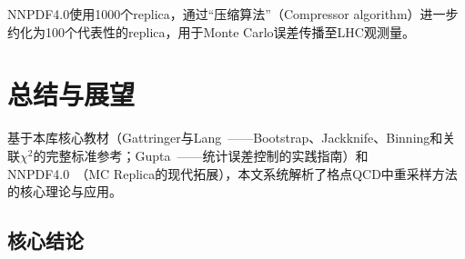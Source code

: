 \documentclass[12pt,a4paper]{ctexart}
\theoremstyle{definition}
\begin{document}
NNPDF4.0使用1000个replica，通过``压缩算法''（Compressor algorithm）进一步约化为100个代表性的replica，用于Monte Carlo误差传播至LHC观测量。

\section{总结与展望}

基于本库核心教材（Gattringer与Lang~\cite{GattringerLang2010}——Bootstrap、Jackknife、Binning和关联$\chi^2$的完整标准参考；Gupta~\cite{Gupta1997intro}——统计误差控制的实践指南）和NNPDF4.0~\cite{NNPDF2021}（MC Replica的现代拓展），本文系统解析了格点QCD中重采样方法的核心理论与应用。

\subsection*{核心结论}
\end{document}
